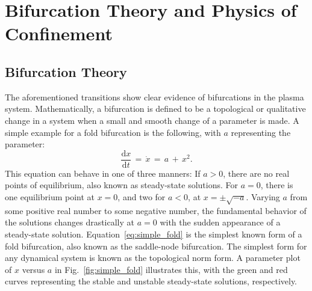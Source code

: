 \chapter{Bifurcation Theory and Physics of Confinement}\label{chapter:physics_bifurcation}

\section{Bifurcation Theory}\label{sec:bif_theory}
The aforementioned transitions show clear evidence of bifurcations in the plasma system.
Mathematically, a bifurcation is defined to be a topological or qualitative change in a system when a small and smooth change of a parameter is made.
A simple example for a fold bifurcation is the following, with $a$ representing the parameter:
\begin{equation} %
	\frac{\text{d}x}{\text{d}t} \,=\, \dot{x} \,=\, a \,+\, x^2.
	\label{eq:simple_fold}
\end{equation}
This equation can behave in one of three manners:
If $a > 0$, there are no real points of equilibrium, also known as steady-state solutions.
For $a = 0$, there is one equilibrium point at $x = 0$, and two for $a < 0$, at $x = \pm\sqrt{-a}$.
Varying $a$ from some positive real number to some negative number, the fundamental behavior of the solutions changes drastically at $a = 0$ with the sudden appearance of a steady-state solution.
Equation~\ref{eq:simple_fold} is the simplest known form of a fold bifurcation, also known as the saddle-node bifurcation.
The simplest form for any dynamical system is known as the topological norm form.
A parameter plot of $x$ versus $a$ in Fig.~\ref{fig:simple_fold} illustrates this, with the green and red curves representing the stable and unstable steady-state solutions, respectively.


